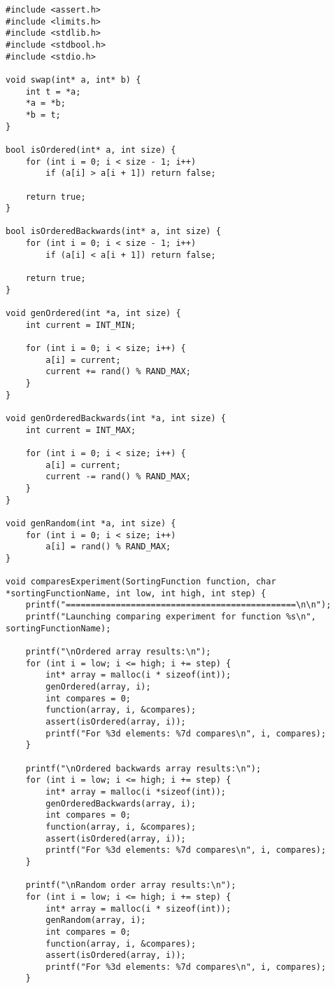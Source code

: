\documentclass[a4paper,14pt]{extarticle}
\begin{document}
\begin{enumerate}
\begin{verbatim}
#include <assert.h>
#include <limits.h>
#include <stdlib.h>
#include <stdbool.h>
#include <stdio.h>

void swap(int* a, int* b) {
    int t = *a;
    *a = *b;
    *b = t;
}

bool isOrdered(int* a, int size) {
    for (int i = 0; i < size - 1; i++)
        if (a[i] > a[i + 1]) return false;

    return true;
}

bool isOrderedBackwards(int* a, int size) {
    for (int i = 0; i < size - 1; i++) 
        if (a[i] < a[i + 1]) return false;
    
    return true;
}

void genOrdered(int *a, int size) {
    int current = INT_MIN;

    for (int i = 0; i < size; i++) {
        a[i] = current;
        current += rand() % RAND_MAX;
    }
}

void genOrderedBackwards(int *a, int size) {
    int current = INT_MAX;

    for (int i = 0; i < size; i++) {
        a[i] = current;
        current -= rand() % RAND_MAX;
    }
}

void genRandom(int *a, int size) {
    for (int i = 0; i < size; i++)
        a[i] = rand() % RAND_MAX;
}

void comparesExperiment(SortingFunction function, char *sortingFunctionName, int low, int high, int step) {
    printf("==============================================\n\n");
    printf("Launching comparing experiment for function %s\n", sortingFunctionName);

    printf("\nOrdered array results:\n");
    for (int i = low; i <= high; i += step) {
        int* array = malloc(i * sizeof(int));
        genOrdered(array, i);
        int compares = 0;
        function(array, i, &compares);
        assert(isOrdered(array, i));
        printf("For %3d elements: %7d compares\n", i, compares);
    }

    printf("\nOrdered backwards array results:\n");
    for (int i = low; i <= high; i += step) {
        int* array = malloc(i *sizeof(int));
        genOrderedBackwards(array, i);
        int compares = 0;
        function(array, i, &compares);
        assert(isOrdered(array, i));
        printf("For %3d elements: %7d compares\n", i, compares);
    }

    printf("\nRandom order array results:\n");
    for (int i = low; i <= high; i += step) {
        int* array = malloc(i * sizeof(int));
        genRandom(array, i);
        int compares = 0;
        function(array, i, &compares);
        assert(isOrdered(array, i));
        printf("For %3d elements: %7d compares\n", i, compares);
    }


\end{verbatim}
\end{enumerate}
\end{document}
